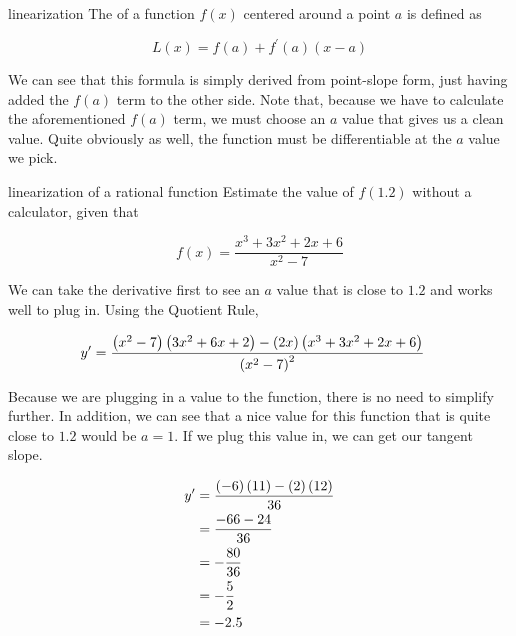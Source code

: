 \begin{definition}{linearization}
    The  of a function \( f \left( x \right) \) centered around a point \( a \) is defined as
    
    \[ L \left( x \right) = f \left( a \right) + f^\prime \left( a \right) \left( x - a \right) \]
\end{definition}

We can see that this formula is simply derived from point-slope form, just having added the \( f \left( a \right) \) term to the other side. Note that, because we have to calculate the aforementioned \( f \left( a \right) \) term, we must choose an \( a \) value that gives us a clean value. Quite obviously as well, the function must be differentiable at the \( a \) value we pick.

\begin{example}{linearization of a rational function}
    Estimate the value of \( f \left( 1.2 \right) \) without a calculator, given that
    
    \[ f \left( x \right) = \dfrac{x^3 + 3x^2 + 2x + 6}{x^2 - 7} \]
    
    \vspace{0.3cm}
    
    We can take the derivative first to see an \( a \) value that is close to \( 1.2 \) and works well to plug in. Using the Quotient Rule,
    
    \begin{align}
        y^\prime &= \dfrac{\left( x^2 - 7 \right) \left(3x^2 + 6x + 2 \right) - \left( 2x \right) \left( x^3 + 3x^2 + 2x + 6 \right)}{\left( x^2 - 7 \right)^2}
    \end{align}
    
    Because we are plugging in a value to the function, there is no need to simplify further. In addition, we can see that a nice value for this function that is quite close to \( 1.2 \) would be \( a = 1 \). If we plug this value in, we can get our tangent slope.
    
    \begin{align}
        y^\prime &= \dfrac{\left( -6 \right) \left( 11 \right) - \left( 2 \right) \left( 12 \right)}{36} \\
        &= \dfrac{-66 - 24}{36} \\
        &= -\dfrac{80}{36} \\
        &= -\dfrac{5}{2} \\
        &= -2.5
    \end{align}
    

\end{example}

